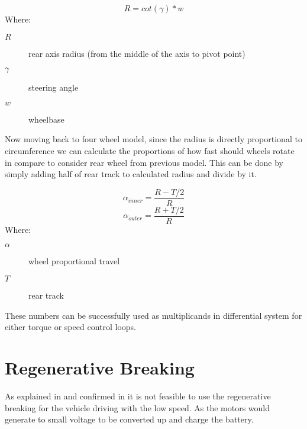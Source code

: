 \begin{equation}\label{diff_eq_w}
    R = cot( \gamma ) * w
\end{equation}
Where:
\begin{description}
    \item[$R$] rear axis radius (from the middle of the axis to pivot point)
    \item[$\gamma$] steering angle
    \item[$w$] wheelbase
\end{description}

Now moving back to four wheel model, since the radius is directly proportional to circumference we can calculate the proportions of how fast should wheels rotate in compare to consider rear wheel from previous model. This can be done by simply adding half of rear track to calculated radius and divide by it.



\begin{equation}\label{diff_eq}
    \alpha_{inner} = \frac{R - T/2}{R}
\end{equation}
\begin{equation}
    \alpha_{outer} = \frac{R + T/2}{R} 
\end{equation}
Where:
\begin{description}
    \item[$\alpha$] wheel proportional travel
    \item[$T$] rear track
\end{description}




These numbers can be successfully used as multiplicands in differential system for either torque or speed control loops.

\section{Regenerative Breaking} \label{regenerative_theory_section}

As explained in \cite{low_speed_regenerative_breaking} and confirmed in \cite{regen_strategy} it is not feasible to use the regenerative breaking for the vehicle driving with the low speed. As the motors would generate to small voltage to be converted up and charge the battery.